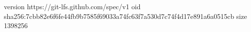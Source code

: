 version https://git-lfs.github.com/spec/v1
oid sha256:7cbb82e6f6fe44fb9b7585f69033a74fc63f7a530d7c74f4d17e891a6a0515cb
size 1398256
